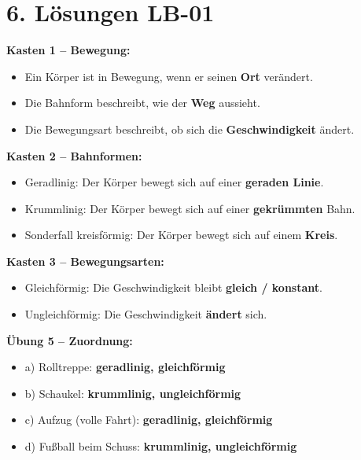 \documentclass[11pt, a4paper]{article}
\newcommand{\lsg}[1]{\textcolor{error}{\textbf{#1}}}
\begin{document}

\section*{6. Lösungen LB-01}

\textbf{Kasten 1 -- Bewegung:}
\begin{itemize}
    \item Ein Körper ist in Bewegung, wenn er seinen \lsg{Ort} verändert.
    \item Die Bahnform beschreibt, wie der \lsg{Weg} aussieht.
    \item Die Bewegungsart beschreibt, ob sich die \lsg{Geschwindigkeit} ändert.
\end{itemize}

\textbf{Kasten 2 -- Bahnformen:}
\begin{itemize}
    \item Geradlinig: Der Körper bewegt sich auf einer \lsg{geraden Linie}.
    \item Krummlinig: Der Körper bewegt sich auf einer \lsg{gekrümmten} Bahn.
    \item Sonderfall kreisförmig: Der Körper bewegt sich auf einem \lsg{Kreis}.
\end{itemize}

\textbf{Kasten 3 -- Bewegungsarten:}
\begin{itemize}
    \item Gleichförmig: Die Geschwindigkeit bleibt \lsg{gleich / konstant}.
    \item Ungleichförmig: Die Geschwindigkeit \lsg{ändert} sich.
\end{itemize}

\textbf{Übung 5 -- Zuordnung:}
\begin{itemize}
    \item a) Rolltreppe: \lsg{geradlinig, gleichförmig}
    \item b) Schaukel: \lsg{krummlinig, ungleichförmig}
    \item c) Aufzug (volle Fahrt): \lsg{geradlinig, gleichförmig}
    \item d) Fußball beim Schuss: \lsg{krummlinig, ungleichförmig}
\end{itemize}

\end{document}
